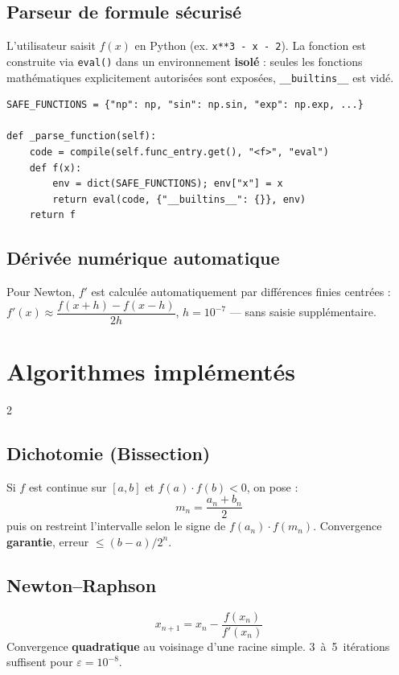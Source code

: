 \documentclass[11pt,a4paper]{article}
\begin{document}
\subsection{Parseur de formule sécurisé}

L'utilisateur saisit $f(x)$ en Python (ex. \texttt{x**3 - x - 2}). La fonction est
construite via \texttt{eval()} dans un environnement \textbf{isolé} : seules les
fonctions mathématiques explicitement autorisées sont exposées, \texttt{\_\_builtins\_\_}
est vidé.

\begin{tcolorbox}[code={Extrait — parseur sécurisé}]
\begin{lstlisting}[style=py]
SAFE_FUNCTIONS = {"np": np, "sin": np.sin, "exp": np.exp, ...}

def _parse_function(self):
    code = compile(self.func_entry.get(), "<f>", "eval")
    def f(x):
        env = dict(SAFE_FUNCTIONS); env["x"] = x
        return eval(code, {"__builtins__": {}}, env)
    return f
\end{lstlisting}
\end{tcolorbox}

\subsection{Dérivée numérique automatique}

Pour Newton, $f'$ est calculée automatiquement par différences finies centrées :
$f'(x)\approx\dfrac{f(x+h)-f(x-h)}{2h}$, $h=10^{-7}$ — sans saisie supplémentaire.

\section{Algorithmes implémentés}

\begin{multicols}{2}

\subsection{Dichotomie (Bissection)}

Si $f$ est continue sur $[a,b]$ et $f(a)\cdot f(b)<0$, on pose :
\[
  m_n = \frac{a_n+b_n}{2}
\]
puis on restreint l'intervalle selon le signe de $f(a_n)\cdot f(m_n)$.
Convergence \textbf{garantie}, erreur $\leq (b-a)/2^n$.

\columnbreak

\subsection{Newton--Raphson}

\[
  x_{n+1} = x_n - \frac{f(x_n)}{f'(x_n)}
\]
Convergence \textbf{quadratique} au voisinage d'une racine simple.
3~à~5~itérations suffisent pour $\varepsilon=10^{-8}$.

\end{multicols}
\end{document}
